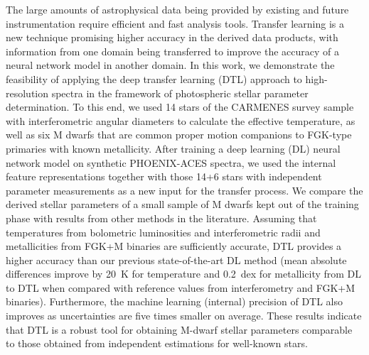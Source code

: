 \documentclass{aa}
\begin{document}
\date{Received 3 May 2022 / Accepted 22 March 2023}

\abstract
{The large amounts of astrophysical data being provided by existing and future instrumentation require efficient and fast analysis tools. 
 Transfer learning is a new technique promising higher accuracy in the derived data products, with information from one domain being transferred to improve the accuracy of a neural network model in another domain. 
In this work, we demonstrate the feasibility of applying the deep transfer learning (DTL) approach to high-resolution spectra in the framework of photospheric stellar parameter determination. To this end, we used 14 stars of the CARMENES survey sample with interferometric angular diameters to calculate the effective temperature, as well as six M dwarfs that are common proper motion companions to FGK-type primaries with known metallicity.
After training a deep learning (DL) neural network model on synthetic PHOENIX-ACES spectra, we used the internal feature representations together with those 14+6 stars with independent parameter measurements as a new input for the transfer process.
We compare the derived stellar parameters of a small sample of M dwarfs kept out of the training phase with results from other methods in the literature. Assuming that temperatures from bolometric luminosities and interferometric radii and metallicities from FGK+M binaries are sufficiently accurate, 
DTL provides a higher accuracy than our previous state-of-the-art DL method (mean absolute differences improve by 20~K for temperature and 0.2~dex for metallicity from DL to DTL when compared with reference values from interferometry and FGK+M binaries). Furthermore, the machine learning (internal) precision of DTL also improves as uncertainties are five times smaller on average.
These results indicate that DTL is a robust tool for obtaining M-dwarf stellar parameters comparable to those obtained from independent estimations for well-known stars.}
%
%
\maketitle
%
\end{document}
